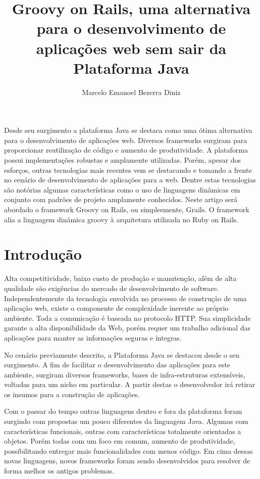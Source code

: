 \documentclass[12pt]{article}
\title{Groovy on Rails, uma alternativa para o desenvolvimento de aplicações web
       sem sair da Plataforma Java}
\author{Marcelo Emanoel Bezerra Diniz\inst{1}}
\begin{document}
 

\maketitle

\begin{resumo} 
    
    Desde seu surgimento a plataforma Java se destaca como uma ótima alternativa
    para o desenvolvimento de aplicações web. Diversos frameworks surgiram para 
    proporcionar reutilização de código e aumento de produtividade. A plataforma
    possui implementações robustas e amplamente utilizadas. Porém, apesar dos 
    esforços, outras tecnologias mais recentes vem se destacando e tomando a 
    frente no cenário de desenvolvimento de aplicações para a web. Dentre estas 
    tecnologias são notórias algumas características como o uso de linguagens 
    dinâmicas em conjunto com padrões de projeto amplamente conhecidos. Neste 
    artigo será abordado o framework Groovy on Rails, ou simplesmente, Grails. 
    O framework alia a linguagem dinâmica groovy
    à arquitetura utilizada no Ruby on Rails. 
    
\end{resumo}

\section{Introdução}

    Alta competitividade, baixo custo de produção e manutenção, além de alta 
    qualidade são exigências do mercado de desenvolvimento de software. 
    Independentemente da tecnologia envolvida no processo de construção de uma 
    aplicação web, existe o componente de complexidade inerente ao próprio 
    ambiente. Toda a comunicação é baseada no protocolo HTTP. Sua simplicidade 
    garante a alta disponibilidade da Web, porém requer um trabalho adicional 
    das aplicações para manter as informações seguras e íntegras.

    No cenário previamente descrito, a Plataforma Java se destacou desde o seu 
    surgimento. A fim de facilitar o desenvolvimento das aplicações para este 
    ambiente, surgiram diversos frameworks, bases de infra-estruturas 
    extensíveis, voltadas para um nicho em particular. A partir destas o 
    desenvolvedor irá retirar os insumos para a construção de aplicações.

    Com o passar do tempo outras linguagens dentro e fora da plataforma foram 
    surgindo com propostas um pouco diferentes da linguagem Java. Algumas com 
    características funcionais, outras com características totalmente orientadas 
    a objetos. Porém todas com um foco em comum, aumento de produtividade, 
    possibilitando entregar mais funcionalidades com menos código. Em cima 
    dessas novas linguagens, novos frameworks foram sendo desenvolvidos para 
    resolver de forma melhor os antigos problemas.
    
\end{document}
